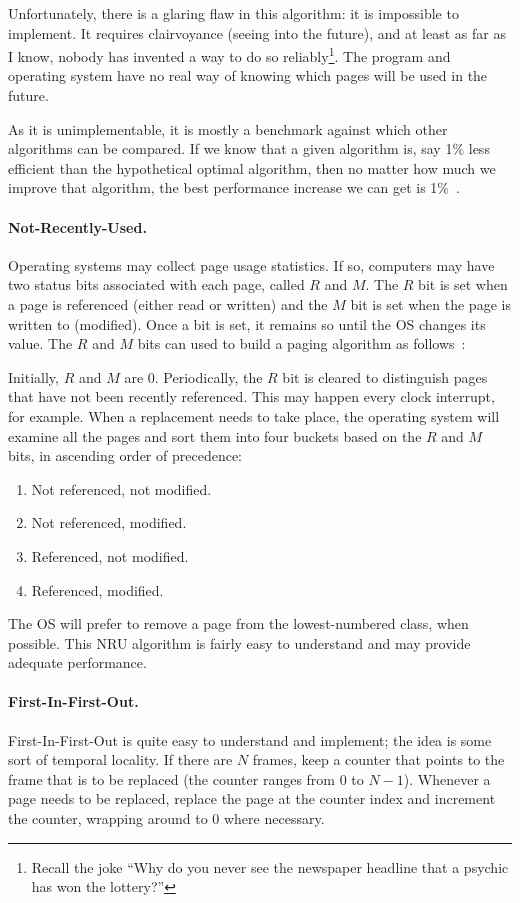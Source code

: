 Unfortunately, there is a glaring flaw in this algorithm: it is impossible to implement. It requires clairvoyance (seeing into the future), and at least as far as I know, nobody has invented a way to do so reliably\footnote{Recall the joke ``Why do you never see the newspaper headline that a psychic has won the lottery?''}. The program and operating system have no real way of knowing which pages will be used in the future.

As it is unimplementable, it is mostly a benchmark against which other algorithms can be compared. If we know that a given algorithm is, say 1\% less efficient than the hypothetical optimal algorithm, then no matter how much we improve that algorithm, the best performance increase we can get is 1\%~\cite{mos}.

\paragraph{Not-Recently-Used.}
Operating systems may collect page usage statistics. If so, computers may have two status bits associated with each page, called $R$ and $M$. The $R$ bit is set when a page is referenced (either read or written) and the $M$ bit is set when the page is written to (modified). Once a bit is set, it remains so until the OS changes its value. The $R$ and $M$ bits can used to build a paging algorithm as follows~\cite{mos}:

Initially, $R$ and $M$ are 0. Periodically, the $R$ bit is cleared to distinguish pages that have not been recently referenced. This may happen every clock interrupt, for example. When a replacement needs to take place, the operating system will examine all the pages and sort them into four buckets based on the $R$ and $M$ bits, in ascending order of precedence:

\begin{enumerate}
	\item Not referenced, not modified.
	\item Not referenced, modified.
	\item Referenced, not modified.
	\item Referenced, modified.
\end{enumerate}

The OS will prefer to remove a page from the lowest-numbered class, when possible. This NRU algorithm is fairly easy to understand and may provide adequate performance.

\paragraph{First-In-First-Out.}
First-In-First-Out is quite easy to understand and implement; the idea is some sort of temporal locality. If there are $N$ frames, keep a counter that points to the frame that is to be replaced (the counter ranges from $0$ to $N-1$). Whenever a page needs to be replaced, replace the page at the counter index and increment the counter, wrapping around to 0 where necessary.

